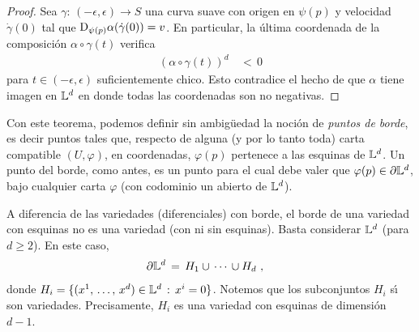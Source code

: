 \begin{proof}
	Sea $\gamma:\,(-\epsilon,\epsilon)\rightarrow S$ una curva suave
	con origen en $\psi(p)$ y velocidad $\dot{\gamma}(0)$ tal que
	$\jacobiana[\psi(p)]{\alpha}(\dot{\gamma}(0))=v$. En particular,
	la \'{u}ltima coordenada de la composici\'{o}n $\alpha\circ\gamma(t)$
	verifica
	\begin{align*}
		(\alpha\circ\gamma(t))^{d} & \,<\,0
	\end{align*}
	para $t\in (-\epsilon,\epsilon)$ suficientemente chico. Esto
	contradice el hecho de que $\alpha$ tiene imagen en $\esquina{d}$
	en donde todas las coordenadas son no negativas.
\end{proof}

Con este teorema, podemos definir sin ambig\"{u}edad la noci\'{o}n
de \emph{puntos de borde}, es decir puntos tales que, respecto de alguna
(y por lo tanto toda) carta compatible $(U,\varphi)$, en coordenadas,
$\varphi(p)$ pertenece a las esquinas de $\esquina{d}$. Un punto del borde,
como antes, es un punto para el cual debe valer que
$\varphi(p)\in\borde[\esquina{d}]$, bajo cualquier carta $\varphi$ (con
codominio un abierto de $\esquina{d}$).

\begin{obsElBordeConEsquinasNoEsVariedad}\label{thm:bordenoesvariedad}
	A diferencia de las variedades (diferenciales) con borde, el borde
	de una variedad con esquinas no es una variedad (con ni sin esquinas).
	Basta considerar $\esquina{d}$ (para $d\geq 2$). En este caso,
	\begin{align*}
		\borde[\esquina{d}] & \,=\,H_{1}\cup\,\cdots\,\cup H_{d}
		\text{ ,}
	\end{align*}
	donde $H_{i}=\{(\lista*{x}{d})\in\esquina{d}\,:\,x^{i}=0\}$. Notemos
	que los subconjuntos $H_{i}$ s\'{\i} son variedades. Precisamente,
	$H_{i}$ es una variedad con esquinas de dimensi\'{o}n $d-1$.
\end{obsElBordeConEsquinasNoEsVariedad}
